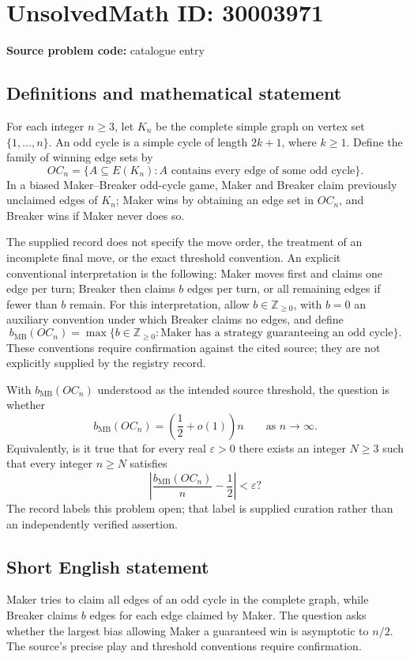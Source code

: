 \documentclass[11pt]{article}
\newcommand{\Z}{\mathbb{Z}}
\begin{document}
\section*{UnsolvedMath ID: 30003971}
\textbf{Source problem code:} catalogue entry
\subsection{Definitions and mathematical statement}
For each integer \(n\geq 3\), let \(K_n\) be the complete simple graph on vertex set \(\{1,\ldots,n\}\). An odd cycle is a simple cycle of length \(2k+1\), where \(k\geq 1\). Define the family of winning edge sets by
\[
OC_n=\bigl\{A\subseteq E(K_n): A\text{ contains every edge of some odd cycle}\bigr\}.
\]
In a biased Maker--Breaker odd-cycle game, Maker and Breaker claim previously unclaimed edges of \(K_n\); Maker wins by obtaining an edge set in \(OC_n\), and Breaker wins if Maker never does so.

The supplied record does not specify the move order, the treatment of an incomplete final move, or the exact threshold convention. An explicit conventional interpretation is the following: Maker moves first and claims one edge per turn; Breaker then claims \(b\) edges per turn, or all remaining edges if fewer than \(b\) remain. For this interpretation, allow \(b\in\Z_{\geq 0}\), with \(b=0\) an auxiliary convention under which Breaker claims no edges, and define
\[
b_{\mathrm{MB}}(OC_n)=\max\bigl\{b\in\Z_{\geq 0}:\text{Maker has a strategy guaranteeing an odd cycle}\bigr\}.
\]
These conventions require confirmation against the cited source; they are not explicitly supplied by the registry record.

With \(b_{\mathrm{MB}}(OC_n)\) understood as the intended source threshold, the question is whether
\[
b_{\mathrm{MB}}(OC_n)=\left(\frac12+o(1)\right)n
\qquad\text{as }n\to\infty.
\]
Equivalently, is it true that for every real \(\varepsilon>0\) there exists an integer \(N\geq 3\) such that every integer \(n\geq N\) satisfies
\[
\left|\frac{b_{\mathrm{MB}}(OC_n)}{n}-\frac12\right|<\varepsilon?
\]
The record labels this problem open; that label is supplied curation rather than an independently verified assertion.
\subsection{Short English statement}
Maker tries to claim all edges of an odd cycle in the complete graph, while Breaker claims \(b\) edges for each edge claimed by Maker. The question asks whether the largest bias allowing Maker a guaranteed win is asymptotic to \(n/2\). The source's precise play and threshold conventions require confirmation.
\end{document}
